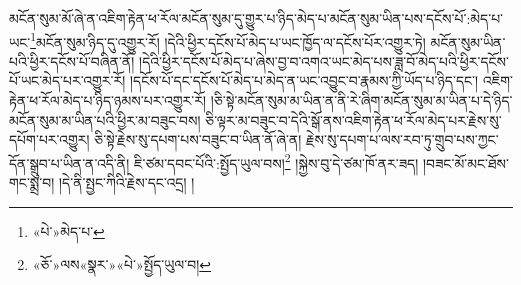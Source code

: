 མངོན་སུམ་མོ་ཞེ་ན་འཇིག་རྟེན་ཕ་རོལ་མངོན་སུམ་དུ་གྱུར་པ་ཉིད་མེད་པ་མངོན་སུམ་ཡིན་པས་དངོས་པོ་:མེད་པ་ཡང་\footnote{«པེ་»མེད་པ་}མངོན་སུམ་ཉིད་དུ་འགྱུར་རོ། །དེའི་ཕྱིར་དངོས་པོ་མེད་པ་ཡང་ཁྱོད་ལ་དངོས་པོར་འགྱུར་ཏེ། མངོན་སུམ་ཡིན་པའི་ཕྱིར་དངོས་པོ་བཞིན་ནོ། །དེའི་ཕྱིར་དངོས་པོ་མེད་པ་ཞེས་བྱ་བ་འགའ་ཡང་མེད་པས་ཟླ་བོ་མེད་པའི་ཕྱིར་དངོས་པོ་ཡང་མེད་པར་འགྱུར་རོ། །དངོས་པོ་དང་དངོས་པོ་མེད་པ་མེད་ན་ཡང་འབྱུང་བ་རྣམས་ཀྱི་ཡོད་པ་ཉིད་དང་། འཇིག་རྟེན་ཕ་རོལ་མེད་པ་ཉིད་ཉམས་པར་འགྱུར་རོ། །ཅི་སྟེ་མངོན་སུམ་མ་ཡིན་ན་ནི་རེ་ཞིག་མངོན་སུམ་མ་ཡིན་པ་དེ་ཉིད་མངོན་སུམ་མ་ཡིན་པའི་ཕྱིར་མ་བཟུང་བས། ཅི་ལྟར་མ་བཟུང་བ་དེའི་སྒོ་ནས་འཇིག་རྟེན་ཕ་རོལ་མེད་པར་རྗེས་སུ་དཔོག་པར་འགྱུར། ཅི་སྟེ་རྗེས་སུ་དཔག་པས་བཟུང་བ་ཡིན་ནོ་ཞེ་ན། རྗེས་སུ་དཔག་པ་ལས་རབ་ཏུ་གྲུབ་པས་ཀྱང་དོན་སྒྲུབ་པ་ཡིན་ན་འདི་ནི། ཇི་ཙམ་དབང་པོའི་:སྤྱོད་ཡུལ་བས།\footnote{«ཅོ་»ལས«སྣར་»«པེ་»སྤྱོད་ཡུལ་བ།} །སྐྱེས་བུ་དེ་ཙམ་ཁོ་ནར་ཟད། །བཟང་མོ་མང་ཐོས་གང་སྨྲ་བ། །དེ་ནི་སྤྱང་ཀིའི་རྗེས་དང་འདྲ། །
